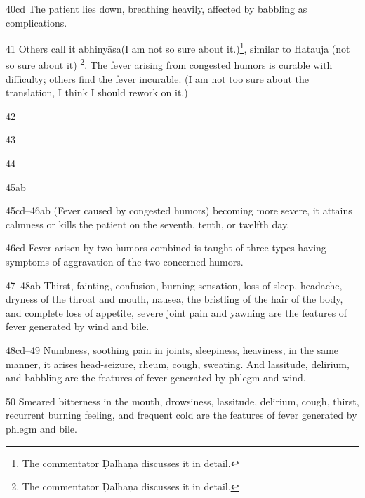 \begin{translation}
    \item[40cd]  The patient lies down, breathing heavily, affected by babbling as
    complications.
    
    \item[41]  Others call it abhinyāsa(I am not so sure about 
    it.)\footnote{The commentator Ḍalhaṇa discusses it in detail.}, similar to 
Hatauja 
    (not so sure about it) \footnote{The commentator Ḍalhaṇa discusses it in 
detail.}. 
    The fever arising from congested humors is curable with
    difficulty; others find the fever incurable. (I am not too sure about
    the translation, I think I should rework on it.)
    
   \item[42]  
    
   \item[43]  
    
   \item[44]  
    
   \item[45ab]  
    
    \item[45cd--46ab]  (Fever caused by congested humors) becoming more 
severe, it
    attains calmness or kills the patient on the seventh, tenth, or twelfth
    day.
    
    
    \item[46cd]  Fever arisen by two humors combined is taught of three types
    having symptoms of aggravation of the two concerned humors.
    
    \item[47--48ab]  Thirst, fainting, confusion, burning sensation, loss of sleep,
    headache, dryness of the throat and mouth, nausea, the bristling of the
    hair of the body, and complete loss of appetite, severe joint pain and
    yawning are the features of fever generated by wind and bile.
    
    
    \item[48cd--49]  Numbness, soothing pain in joints, sleepiness, heaviness, in
    the same manner, it arises head-seizure, rheum, cough, sweating. And
    lassitude, delirium, and babbling are the features of fever generated by
    phlegm and wind.
    
    \item[50]  Smeared bitterness in the mouth, drowsiness, lassitude, delirium,
    cough, thirst, recurrent burning feeling, and frequent cold are the
    features of fever generated by phlegm and bile.
    

\end{translation}
